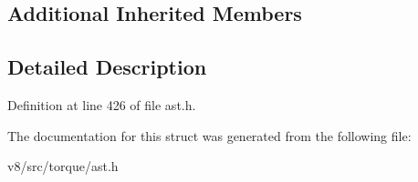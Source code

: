\subsection*{Additional Inherited Members}


\subsection{Detailed Description}


Definition at line 426 of file ast.\+h.



The documentation for this struct was generated from the following file\+:\begin{DoxyCompactItemize}
\item 
v8/src/torque/ast.\+h\end{DoxyCompactItemize}
